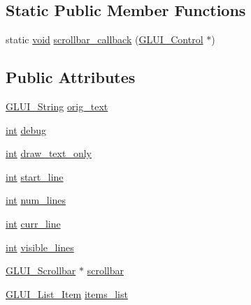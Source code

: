 \subsection*{Static Public Member Functions}
\begin{DoxyCompactItemize}
\item 
static \hyperlink{wglext_8h_a9e6b7f1933461ef318bb000d6bd13b83}{void} \hyperlink{class_g_l_u_i___list_a795f750b62f376255690f31a4ee5104d}{scrollbar\+\_\+callback} (\hyperlink{class_g_l_u_i___control}{G\+L\+U\+I\+\_\+\+Control} $\ast$)
\end{DoxyCompactItemize}
\subsection*{Public Attributes}
\begin{DoxyCompactItemize}
\item 
\hyperlink{glui_8h_aada824856f7bcf29794719981ebd8f60}{G\+L\+U\+I\+\_\+\+String} \hyperlink{class_g_l_u_i___list_a95ca3818d11b598237439b8ebb414d34}{orig\+\_\+text}
\item 
\hyperlink{wglext_8h_a500a82aecba06f4550f6849b8099ca21}{int} \hyperlink{class_g_l_u_i___list_a542ba0f0fd1983f83329763d0a0acb62}{debug}
\item 
\hyperlink{wglext_8h_a500a82aecba06f4550f6849b8099ca21}{int} \hyperlink{class_g_l_u_i___list_a1179328db01f8d097e111fa5d2015a40}{draw\+\_\+text\+\_\+only}
\item 
\hyperlink{wglext_8h_a500a82aecba06f4550f6849b8099ca21}{int} \hyperlink{class_g_l_u_i___list_a475abba021f135544370a6ac04a9c8b1}{start\+\_\+line}
\item 
\hyperlink{wglext_8h_a500a82aecba06f4550f6849b8099ca21}{int} \hyperlink{class_g_l_u_i___list_a0747619e77ea5031f12ca09e75162edd}{num\+\_\+lines}
\item 
\hyperlink{wglext_8h_a500a82aecba06f4550f6849b8099ca21}{int} \hyperlink{class_g_l_u_i___list_ab679e49f81d8c137d2511eb42bed52f4}{curr\+\_\+line}
\item 
\hyperlink{wglext_8h_a500a82aecba06f4550f6849b8099ca21}{int} \hyperlink{class_g_l_u_i___list_ad400982efb9f4155bc7294f858f4de87}{visible\+\_\+lines}
\item 
\hyperlink{class_g_l_u_i___scrollbar}{G\+L\+U\+I\+\_\+\+Scrollbar} $\ast$ \hyperlink{class_g_l_u_i___list_ac8fe09ec0191ac3ac6c71b1e6ddb8751}{scrollbar}
\item 
\hyperlink{class_g_l_u_i___list___item}{G\+L\+U\+I\+\_\+\+List\+\_\+\+Item} \hyperlink{class_g_l_u_i___list_afc3bcc6dbb8850c0639179706b0cd9be}{items\+\_\+list}

\end{DoxyCompactItemize}
